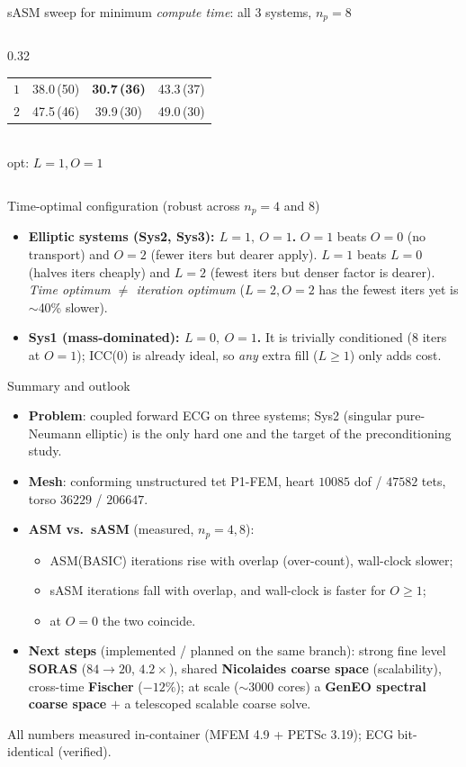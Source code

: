 \documentclass[aspectratio=169,11pt]{beamer}
\begin{document}
\begin{frame}{sASM sweep for minimum \emph{compute time}: all 3 systems, $n_p{=}8$}
\begin{columns}[T]
\begin{column}{0.32\textwidth}
\begin{tabular}{@{}c|ccc@{}}
$1$ & 38.0\,(50) & \textbf{\textcolor{good}{30.7\,(36)}} & 43.3\,(37) \\
$2$ & 47.5\,(46) & 39.9\,(30) & 49.0\,(30) \\
\bottomrule
\end{tabular}\\[0.15em]
{\tiny opt: $L{=}1,O{=}1$}
\end{column}
\end{columns}
\vspace{0.3em}
\begin{block}{Time-optimal configuration (robust across $n_p{=}4$ and $8$)}
\footnotesize
\begin{itemize}\itemsep1pt
\item \textbf{Elliptic systems (Sys2, Sys3): $\boxed{L{=}1,\ O{=}1}$.} $O{=}1$ beats $O{=}0$ (no transport) and $O{=}2$ (fewer iters but dearer apply). $L{=}1$ beats $L{=}0$ (halves iters cheaply) and $L{=}2$ (fewest iters but denser factor is dearer). \emph{Time optimum $\ne$ iteration optimum} ($L{=}2,O{=}2$ has the fewest iters yet is $\sim$40\% slower).
\item \textbf{Sys1 (mass-dominated): $\boxed{L{=}0,\ O{=}1}$.} It is trivially conditioned (8 iters at $O{=}1$); ICC(0) is already ideal, so \emph{any} extra fill ($L{\ge}1$) only adds cost.
\end{itemize}
\end{block}
\end{frame}

\begin{frame}{Summary and outlook}
\begin{itemize}
\item \textbf{Problem}: coupled forward ECG on three systems; Sys2 (singular pure-Neumann elliptic) is the only hard one and the target of the preconditioning study.
\item \textbf{Mesh}: conforming unstructured tet P1-FEM, heart $10085$ dof / $47582$ tets, torso $36229$ / $206647$.
\item \textbf{ASM vs.\ sASM} (measured, $n_p{=}4,8$):
  \begin{itemize}
  \item ASM(BASIC) iterations \textcolor{bad}{rise with overlap} (over-count), wall-clock slower;
  \item sASM iterations \textcolor{good}{fall with overlap}, and wall-clock is faster for $O{\ge}1$;
  \item at $O{=}0$ the two coincide.
  \end{itemize}
\item \textbf{Next steps} (implemented / planned on the same branch): strong fine level \textbf{SORAS} ($84{\to}20$, $4.2\times$), shared \textbf{Nicolaides coarse space} (scalability), cross-time \textbf{Fischer} ($-12\%$); at scale ($\sim$3000 cores) a \textbf{GenEO spectral coarse space} $+$ a telescoped scalable coarse solve.
\end{itemize}
\vspace{0.4em}
\centering\footnotesize All numbers measured in-container (MFEM 4.9 + PETSc 3.19); ECG bit-identical (verified).
\end{frame}
\end{document}
